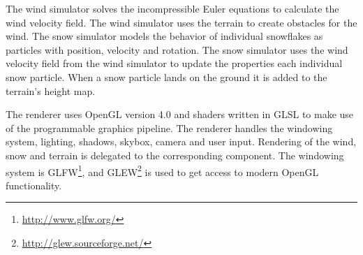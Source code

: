 The wind simulator solves the incompressible Euler equations to calculate the
wind velocity field. The wind simulator uses the terrain to create obstacles for
the wind. The snow simulator models the behavior of individual snowflakes as
particles with position, velocity and rotation. The snow simulator uses the
wind velocity field from the wind simulator to update the properties each
individual snow particle. When a snow particle lands on the ground it is added
to the terrain's height map.

The renderer uses OpenGL version 4.0 and shaders written in GLSL to make use of 
the programmable graphics pipeline. The renderer handles the windowing system, 
lighting, shadows, skybox, camera and user input. Rendering of the wind, snow and 
terrain is delegated to the corresponding component. The windowing system 
is GLFW\footnote{\url{http://www.glfw.org/}}, and GLEW\footnote{\url{http://glew.sourceforge.net/}} 
is used to get access to modern OpenGL functionality. 
